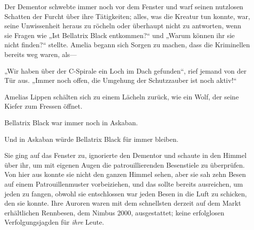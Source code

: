 Der Dementor schwebte immer noch vor dem Fenster und warf seinen nutzlosen Schatten der Furcht über ihre Tätigkeiten; alles, was die Kreatur tun konnte, war, seine Unwissenheit heraus zu röcheln oder überhaupt nicht zu antworten, wenn sie Fragen wie „Ist Bellatrix Black entkommen?“ und „Warum können ihr sie nicht finden?“ stellte. Amelia begann sich Sorgen zu machen, dass die Kriminellen bereits weg waren, als—

„Wir haben über der C-Spirale ein Loch im Dach gefunden“, rief jemand von der Tür aus. „Immer noch offen, die Umgehung der Schutzzauber ist noch aktiv!“

Amelias Lippen schälten sich zu einem Lächeln zurück, wie ein Wolf, der seine Kiefer zum Fressen öffnet.

Bellatrix Black war immer noch in Askaban.

Und in Askaban würde Bellatrix Black für immer bleiben.

Sie ging auf das Fenster zu, ignorierte den Dementor und schaute in den Himmel über ihr, um mit eigenen Augen die patrouillierenden Besenstiele zu überprüfen. Von hier aus konnte sie nicht den ganzen Himmel sehen, aber sie sah zehn Besen auf einem Patrouillenmuster vorbeiziehen, und das sollte bereits ausreichen, um jeden zu fangen, obwohl sie entschlossen war jeden Besen in die Luft zu schicken, den sie konnte. Ihre Auroren waren mit dem schnellsten derzeit auf dem Markt erhältlichen Rennbesen, dem Nimbus 2000, ausgestattet; keine erfolglosen Verfolgungsjagden für \emph{ihre} Leute.

